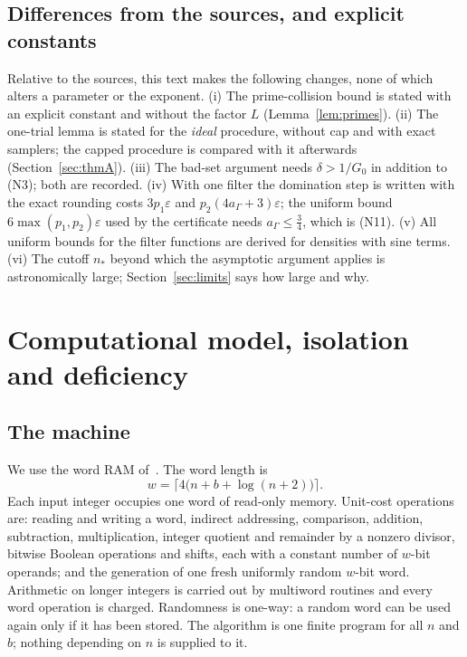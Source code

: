 \documentclass[11pt]{article}
\theoremstyle{definition}
\newcommand{\eps}{\varepsilon}
\begin{document}
\subsection{Differences from the sources, and explicit constants}\label{sec:sources}
Relative to the sources, this text makes the following changes, none of which alters a parameter or the exponent.
(i) The prime-collision bound is stated with an explicit constant and without the factor $L$
(Lemma~\ref{lem:primes}). (ii) The one-trial lemma is stated for the \emph{ideal} procedure, without cap and with
exact samplers; the capped procedure is compared with it afterwards (Section~\ref{sec:thmA}). (iii) The bad-set
argument needs $\delta>1/G_0$ in addition to \textup{(N3)}; both are recorded. (iv) With one filter the domination
step is written with the exact rounding costs $3p_1\eps$ and $p_2(4a_\Gamma+3)\eps$; the uniform bound
$6\max(p_1,p_2)\eps$ used by the certificate needs $a_\Gamma\le\tfrac34$, which is \textup{(N11)}. (v) All uniform
bounds for the filter functions are derived for densities with sine terms. (vi) The cutoff $n_*$ beyond which the
asymptotic argument applies is astronomically large; Section~\ref{sec:limits} says how large and why.

\section{Computational model, isolation and deficiency}\label{sec:model}

\subsection{The machine}
We use the word RAM of~\cite{OAI}. The word length is
\begin{equation}\label{eq:word}
 w=\bigl\lceil 4\bigl(n+b+\log(n+2)\bigr)\bigr\rceil .
\end{equation}
Each input integer occupies one word of read-only memory. Unit-cost operations are: reading and writing a word,
indirect addressing, comparison, addition, subtraction, multiplication, integer quotient and remainder by a nonzero
divisor, bitwise Boolean operations and shifts, each with a constant number of $w$-bit operands; and the generation
of one fresh uniformly random $w$-bit word. Arithmetic on longer integers is carried out by multiword routines and
every word operation is charged. Randomness is one-way: a random word can be used again only if it has been stored.
The algorithm is one finite program for all $n$ and $b$; nothing depending on $n$ is supplied to it.
\end{document}

